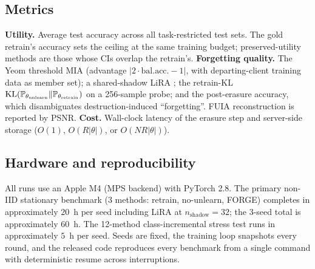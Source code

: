 \subsection{Metrics}
\label{sec:experiments-metrics}

\textbf{Utility.} Average test accuracy across all task-restricted test sets.
The gold retrain's accuracy sets the ceiling at the same training budget;
preserved-utility methods are those whose CIs overlap the retrain's.
\textbf{Forgetting quality.} The Yeom threshold MIA \cite{yeom2018privacy}
(advantage $|2\cdot\mathrm{bal.acc.} - 1|$, with departing-client training data as
member set); a shared-shadow LiRA \cite{carlini2022lira}; the retrain-KL
$\mathrm{KL}(\mathbb{P}_{\theta_\mathrm{unlearn}} \| \mathbb{P}_{\theta_\mathrm{retrain}})$ on a
256-sample probe; and the post-erasure accuracy, which disambiguates
destruction-induced ``forgetting''. FUIA reconstruction \cite{fuia2025} is reported
by PSNR.
\textbf{Cost.} Wall-clock latency of the erasure step and server-side storage
($O(1)$, $O(R|\theta|)$, or $O(NR|\theta|)$).

\subsection{Hardware and reproducibility}

All runs use an Apple M4 (MPS backend) with PyTorch 2.8. The primary non-IID
stationary benchmark (3 methods: retrain, no-unlearn, FORGE) completes in
approximately $20$~h per seed including LiRA at $n_\mathrm{shadow}{=}32$; the
3-seed total is approximately $60$~h. The 12-method class-incremental stress
test runs in approximately $5$~h per seed. Seeds are fixed, the training
loop snapshots every round, and the released code reproduces every benchmark
from a single command with deterministic resume across interruptions.
